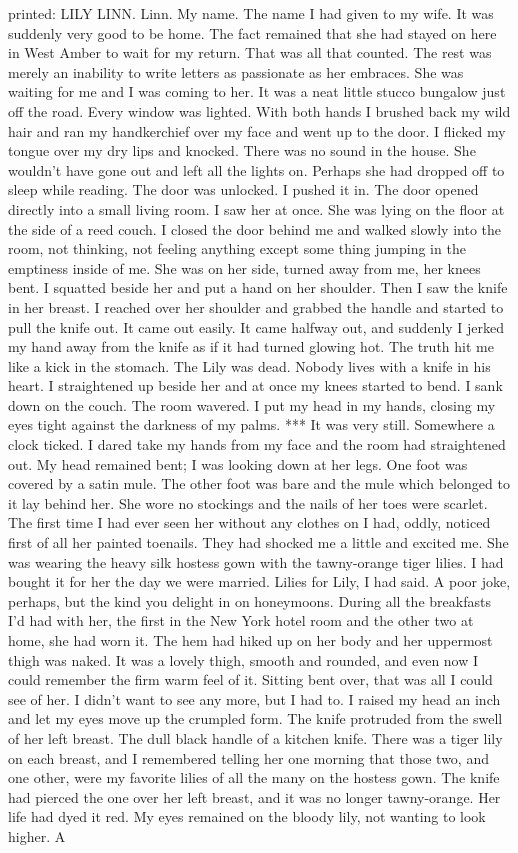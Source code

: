 \documentclass{novel}
\begin{document}
printed: LILY LINN. Linn. My name. The name I had given to my wife. It was suddenly very good to be home. The fact remained that she had stayed on here in West Amber to wait for my return. That was all that counted. The rest was merely an inability to write letters as passionate as her embraces. She was waiting for me and I was coming to her. It was a neat little stucco bungalow just off the road. Every window was lighted. With both hands I brushed back my wild hair and ran my handkerchief over my face and went up to the door. I flicked my tongue over my dry lips and knocked. There was no sound in the house. She wouldn’t have gone out and left all the lights on. Perhaps she had dropped off to sleep while reading. The door was unlocked. I pushed it in. The door opened directly into a small living room. I saw her at once. She was lying on the floor at the side of a reed couch. I closed the door behind me and walked slowly into the room, not thinking, not feeling anything except some thing jumping in the emptiness inside of me. She was on her side, turned away from me, her knees bent. I squatted beside her and put a hand on her shoulder. Then I saw the knife in her breast. I reached over her shoulder and grabbed the handle and started to pull the knife out. It came out easily. It came halfway out, and suddenly I jerked my hand away from the knife as if it had turned glowing hot. The truth hit me like a kick in the stomach. The Lily was dead. Nobody lives with a knife in his heart. I straightened up beside her and at once my knees started to bend. I sank down on the couch. The room wavered. I put my head in my hands, closing my eyes tight against the darkness of my palms. *** It was very still. Somewhere a clock ticked. I dared take my hands from my face and the room had straightened out. My head remained bent; I was looking down at her legs. One foot was covered by a satin mule. The other foot was bare and the mule which belonged to it lay behind her. She wore no stockings and the nails of her toes were scarlet. The first time I had ever seen her without any clothes on I had, oddly, noticed first of all her painted toenails. They had shocked me a little and excited me. She was wearing the heavy silk hostess gown with the tawny-orange tiger lilies. I had bought it for her the day we were married. Lilies for Lily, I had said. A poor joke, perhaps, but the kind you delight in on honeymoons. During all the breakfasts I’d had with her, the first in the New York hotel room and the other two at home, she had worn it. The hem had hiked up on her body and her uppermost thigh was naked. It was a lovely thigh, smooth and rounded, and even now I could remember the firm warm feel of it. Sitting bent over, that was all I could see of her. I didn’t want to see any more, but I had to. I raised my head an inch and let my eyes move up the crumpled form. The knife protruded from the swell of her left breast. The dull black handle of a kitchen knife. There was a tiger lily on each breast, and I remembered telling her one morning that those two, and one other, were my favorite lilies of all the many on the hostess gown. The knife had pierced the one over her left breast, and it was no longer tawny-orange. Her life had dyed it red. My eyes remained on the bloody lily, not wanting to look higher. A 
\end{document}
